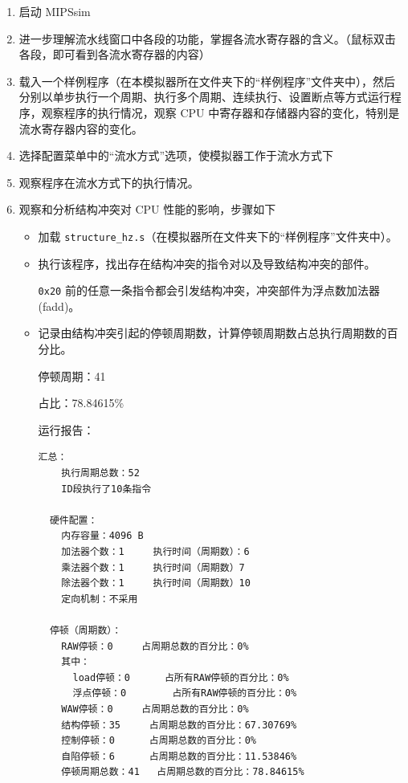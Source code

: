 \documentclass[blue,normal,cn]{elegantnote}
\newcommand{\code}[1]{\colorbox{light-gray}{\texttt{#1}}}
\begin{document}
\begin{enumerate}[wide=0pt, listparindent=2em, parsep=0pt]
  \item 启动 MIPSsim
  \item 进一步理解流水线窗口中各段的功能，掌握各流水寄存器的含义。（鼠标双击各段，即可看到各流水寄存器的内容）
  \item 载入一个样例程序（在本模拟器所在文件夹下的“样例程序”文件夹中），然后分别以单步执行一个周期、执行多个周期、连续执行、设置断点等方式运行程序，观察程序的执行情况，观察 CPU 中寄存器和存储器内容的变化，特别是流水寄存器内容的变化。
  \item 选择配置菜单中的“流水方式”选项，使模拟器工作于流水方式下
  \item 观察程序在流水方式下的执行情况。
  \item 观察和分析结构冲突对 CPU 性能的影响，步骤如下

        \begin{itemize}[leftmargin=3em, listparindent=2em, parsep=0pt]
          \item 加载 \code{structure\_hz.s}（在模拟器所在文件夹下的“样例程序”文件夹中）。
          \item 执行该程序，找出存在结构冲突的指令对以及导致结构冲突的部件。


                \textcolor{ans}{\code{0x20} 前的任意一条指令都会引发结构冲突，冲突部件为浮点数加法器(fadd)。}


          \item 记录由结构冲突引起的停顿周期数，计算停顿周期数占总执行周期数的百分比。


                \textcolor{ans} {停顿周期：41}

                \textcolor{ans} {占比：78.84615\%}

                \textcolor{ans}{运行报告：}
                \begin{lstlisting}
汇总：
    执行周期总数：52
    ID段执行了10条指令

  硬件配置：
    内存容量：4096 B
    加法器个数：1		执行时间（周期数）：6
    乘法器个数：1		执行时间（周期数）7		
    除法器个数：1		执行时间（周期数）10		
    定向机制：不采用

  停顿（周期数）：
    RAW停顿：0		占周期总数的百分比：0%
    其中：
      load停顿：0		占所有RAW停顿的百分比：0%
      浮点停顿：0		占所有RAW停顿的百分比：0%
    WAW停顿：0		占周期总数的百分比：0%
    结构停顿：35		占周期总数的百分比：67.30769%
    控制停顿：0		占周期总数的百分比：0%
    自陷停顿：6		占周期总数的百分比：11.53846%
    停顿周期总数：41	占周期总数的百分比：78.84615%


\end{lstlisting}
\end{itemize}
\end{enumerate}
\end{document}
